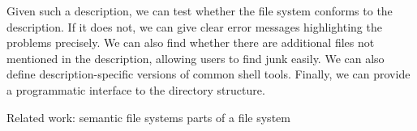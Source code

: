 \documentclass[nocopyrightspace,10pt]{sigplanconf}
\begin{document}
Given such a description, we can test whether the file system conforms
to the description.  If it does not, we can give clear error messages
highlighting the problems precisely.  We can also find whether there
are additional files not mentioned in the description, allowing users
to find junk easily.  We can also define description-specific versions
of common shell tools.  Finally, we can provide a programmatic
interface to the directory structure.

Related work:
  semantic file systems
  parts of a file system



%


\end{document}
